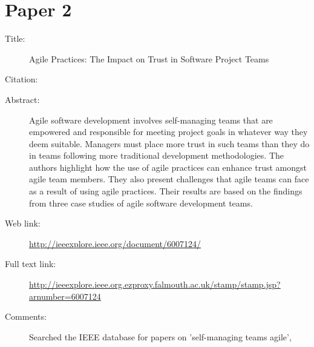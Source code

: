 \documentclass{scrartcl}
\begin{document}
\section*{Paper 2}
\begin{description}
\item[Title:] Agile Practices: The Impact on Trust in Software Project Teams
\item[Citation:] \cite{Paper2}
\item[Abstract:] {Agile software development involves self-managing teams that are empowered and responsible for meeting project goals in whatever way they deem suitable. Managers must place more trust in such teams than they do in teams following more traditional development methodologies. The authors highlight how the use of agile practices can enhance trust amongst agile team members. They also present challenges that agile teams can face as a result of using agile practices. Their results are based on the findings from three case studies of agile software development teams.}
\item[Web link:] \url{http://ieeexplore.ieee.org/document/6007124/}
\item[Full text link:] \url{http://ieeexplore.ieee.org.ezproxy.falmouth.ac.uk/stamp/stamp.jsp?arnumber=6007124}
\item[Comments:] Searched the IEEE database for papers on 'self-managing teams agile', 
\end{description}
\end{document}
